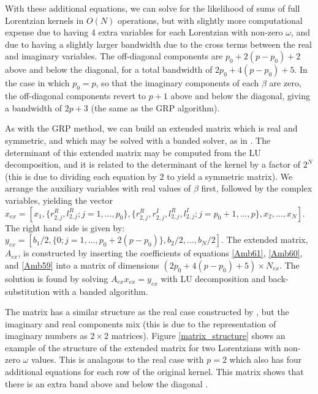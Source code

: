 \documentclass[manuscript, letterpaper]{aastex6}
\begin{document}
With these additional equations, we can solve for the likelihood of sums of full Lorentzian kernels
in $O(N)$ operations, but with slightly more computational expense due to having 4 extra variables
for each Lorentzian with non-zero $\omega$, and due to having a slightly larger bandwidth due to the
cross terms between the real and imaginary variables.  The off-diagonal components are $p_0+2(p-p_0)+2$ above
and below the diagonal, for a total bandwidth of $2p_0+4(p-p_0)+5$. In the case in which $p_0=p$, so
that the imaginary components of each $\beta$ are zero, the off-diagonal components revert to $p+1$
above and below the diagonal, giving a bandwidth of $2p+3$ (the same as the GRP algorithm).

As with the GRP method, we can build an extended matrix which is real and symmetric, and which may be
solved with a banded solver, as in \citet{NumericalRecipes}.  The determinant of this extended matrix
may be computed from the LU decomposition, and it is related to the determinant of the kernel by a
factor of $2^N$ (this is due to dividing each equation by $2$ to yield a symmetric matrix).
We arrange the auxiliary variables with real values of
$\beta$ first, followed by the complex variables, yielding the vector
$x_{ex} = [x_1, \{r_{2,j}^R,l_{2,j}^R;j=1,...,p_0\}, \{r_{2,j}^R,r_{2,j}^I,l_{2,j}^R,l_{2,j}^I;j=p_0+1,...,p\},
x_2, ..., x_N]$.  The right hand side is given by: $y_{ex} = [b_1/2, \{0; j=1,...,p_0+2(p-p_0)\}, b_2/2, ..., b_N/2]$.
The extended matrix, $A_{ex}$, is constructed by inserting the coefficients of equations \ref{Amb61},
\ref{Amb60}, and \ref{Amb59} into a matrix of dimensions $(2p_0+4(p-p_0)+5) \times N_{ex}$.
The solution is found by solving $A_{ex} x_{ex} = y_{ex}$ with LU decomposition and back-substitution
with a banded algorithm.

The matrix has a similar structure as the real case constructed by \citep{Ambikasaran2015}, but the
imaginary and real components mix (this is due to the representation of imaginary numbers as
$2\times 2$ matrices).  Figure \ref{matrix_structure} shows an example of the structure of the extended
matrix for two Lorentzians with non-zero $\omega$ values.  This is analagous to the real case with
$p=2$ which also has four additional equations for each row of the original kernel.  This matrix shows
that there is an extra band above and below the diagonal \citep[compare with Figure 2 of][]{Ambikasaran2015}.
\end{document}
